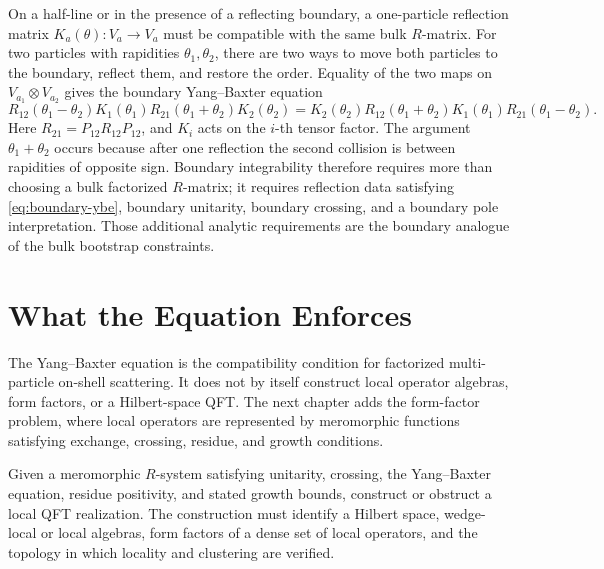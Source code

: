 On a half-line or in the presence of a reflecting boundary, a one-particle
reflection matrix \(K_a(\theta):V_a\to V_a\) must be compatible with the same
bulk \(R\)-matrix.  For two particles with rapidities \(\theta_1,\theta_2\),
there are two ways to move both particles to the boundary, reflect them, and
restore the order.  Equality of the two maps on
\(V_{a_1}\otimes V_{a_2}\) gives the boundary Yang--Baxter equation
\begin{equation}
\label{eq:boundary-ybe}
  R_{12}(\theta_1-\theta_2)K_1(\theta_1)
  R_{21}(\theta_1+\theta_2)K_2(\theta_2)
  =
  K_2(\theta_2)R_{12}(\theta_1+\theta_2)
  K_1(\theta_1)R_{21}(\theta_1-\theta_2).
\end{equation}
Here \(R_{21}=P_{12}R_{12}P_{12}\), and \(K_i\) acts on the \(i\)-th tensor
factor.  The argument \(\theta_1+\theta_2\) occurs because after one reflection
the second collision is between rapidities of opposite sign.  Boundary
integrability therefore requires more than choosing a bulk factorized
\(R\)-matrix; it requires reflection data satisfying
\eqref{eq:boundary-ybe}, boundary unitarity, boundary crossing, and a boundary
pole interpretation.  Those additional analytic requirements are the boundary
analogue of the bulk bootstrap constraints.

\section{What the Equation Enforces}

The Yang--Baxter equation is the compatibility condition for factorized
multi-particle on-shell scattering.  It does not by itself construct local
operator algebras, form factors, or a Hilbert-space QFT.  The next chapter
adds the form-factor problem, where local operators are represented by
meromorphic functions satisfying exchange, crossing, residue, and growth
conditions.

\begin{openproblem}
\label{op:r-matrix-to-local-fields}
Given a meromorphic \(R\)-system satisfying unitarity, crossing, the
Yang--Baxter equation, residue positivity, and stated growth bounds, construct
or obstruct a local QFT realization.  The construction must identify a Hilbert
space, wedge-local or local algebras, form factors of a dense set of local
operators, and the topology in which locality and clustering are verified.
\end{openproblem}
